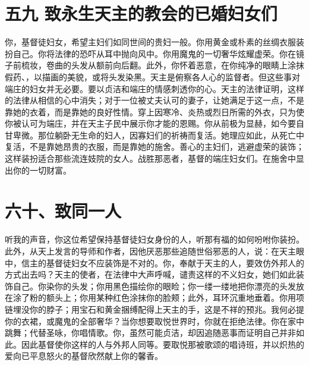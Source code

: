 
\section{五九 致永生天主的教会的已婚妇女们}

你，基督徒妇女，希望主妇们如同世间的贵妇一般。你用黄金或朴素的丝绸衣服装扮自己。你将法律的恐吓从耳中抛向风中。你用魔鬼的一切奢华炫耀虚荣。你在镜子前梳妆，卷曲的头发从额前向后翻。此外，你怀着恶意，在你纯净的眼睛上涂抹假药、，以描画的美貌，或将头发染黑。天主是俯察各人心的监督者。但这些事对端庄的妇女并无必要。要以贞洁和端庄的情感刺透你的心。天主的法律证明，这样的法律从相信的心中消失；对于一位被丈夫认可的妻子，让她满足于这一点，不是靠她的衣着，而是靠她的良好性情。穿上因寒冷、炎热或烈日所需的外衣，只为使你被认可为端庄，并在天主子民中展示你才能的恩赐。你从前极为显赫，如今要自甘卑微。那位躺卧无生命的妇人，因寡妇们的祈祷而复活。她理应如此，从死亡中复活，不是靠她昂贵的衣服，而是靠她的施舍。善心的主妇们，逃避虚荣的装饰；这样装扮适合那些流连妓院的女人。战胜那恶者，基督的端庄妇女们。在施舍中显出你的一切财富。\par


\section{六十、致同一人}

听我的声音，你这位希望保持基督徒妇女身份的人，听那有福的如何吩咐你装扮。此外，从天上发言的导师和作者，因他厌恶那些追随世俗邪恶的人，说：在天主眼中，信主的基督徒妇女不应装饰是不对的。你，奉献于天主的人，要效仿外邦人的方式出去吗？天主的使者，在法律中大声呼喊，谴责这样的不义妇女，她们如此装饰自己。你染你的头发；你用黑色描绘你的眼睑；你一缕一缕地把你漂亮的头发放在涂了粉的额头上；你用某种红色涂抹你的脸颊；此外，耳环沉重地垂着。你用项链埋没你的脖子；用宝石和黄金捆缚配得上天主的手，这是不祥的预兆。我何必提你的衣裙，或魔鬼的全部奢华？当你想要取悦世界时，你就在拒绝法律。你在家中跳舞；代替圣咏，你唱情歌。你，虽然可能贞洁，却因追随恶事而证明自己并非如此。因此基督使你这样的人与外邦人同等。要取悦那被歌颂的唱诗班，并以炽热的爱向已平息怒火的基督欣然献上你的馨香。\par


